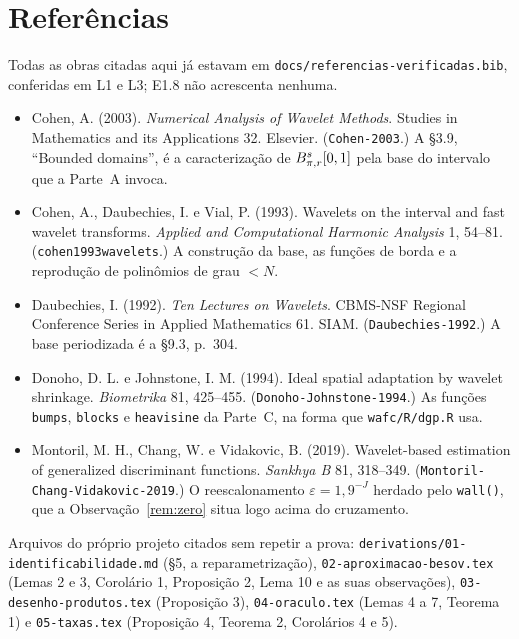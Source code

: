 \documentclass[11pt,a4paper]{article}
\newcommand{\eps}{\varepsilon}
\begin{document}
\section*{Referências}
\sloppy

Todas as obras citadas aqui já estavam em
\texttt{docs/referencias-verificadas.bib}, conferidas em L1 e L3; E1.8 não
acrescenta nenhuma.

\begin{itemize}[nosep]
  \item Cohen, A. (2003). \emph{Numerical Analysis of Wavelet Methods}.
    Studies in Mathematics and its Applications 32. Elsevier.
    (\texttt{Cohen-2003}.) A \S 3.9, ``Bounded domains'', é a caracterização
    de $B^{s}_{\pi,r}[0,1]$ pela base do intervalo que a Parte~A invoca.
  \item Cohen, A., Daubechies, I. e Vial, P. (1993). Wavelets on the interval
    and fast wavelet transforms. \emph{Applied and Computational Harmonic
    Analysis} 1, 54--81. (\texttt{cohen1993wavelets}.) A construção da base,
    as funções de borda e a reprodução de polinômios de grau $< N$.
  \item Daubechies, I. (1992). \emph{Ten Lectures on Wavelets}. CBMS-NSF
    Regional Conference Series in Applied Mathematics 61. SIAM.
    (\texttt{Daubechies-1992}.) A base periodizada é a \S 9.3, p.~304.
  \item Donoho, D. L. e Johnstone, I. M. (1994). Ideal spatial adaptation by
    wavelet shrinkage. \emph{Biometrika} 81, 425--455.
    (\texttt{Donoho-Johnstone-1994}.) As funções \texttt{bumps},
    \texttt{blocks} e \texttt{heavisine} da Parte~C, na forma que
    \texttt{wafc/R/dgp.R} usa.
  \item Montoril, M. H., Chang, W. e Vidakovic, B. (2019). Wavelet-based
    estimation of generalized discriminant functions. \emph{Sankhya B} 81,
    318--349. (\texttt{Montoril-Chang-Vidakovic-2019}.) O reescalonamento
    $\eps = 1{,}9^{-J}$ herdado pelo \texttt{wall()}, que a
    Observação~\ref{rem:zero} situa logo acima do cruzamento.
\end{itemize}

Arquivos do próprio projeto citados sem repetir a prova:
\texttt{derivations/01-identificabilidade.md} (§5, a reparametrização),
\texttt{02-aproximacao-besov.tex} (Lemas 2 e 3, Corolário 1, Proposição 2,
Lema 10 e as suas observações), \texttt{03-desenho-produtos.tex}
(Proposição 3), \texttt{04-oraculo.tex} (Lemas 4 a 7, Teorema 1) e
\texttt{05-taxas.tex} (Proposição 4, Teorema 2, Corolários 4 e 5).
\end{document}

